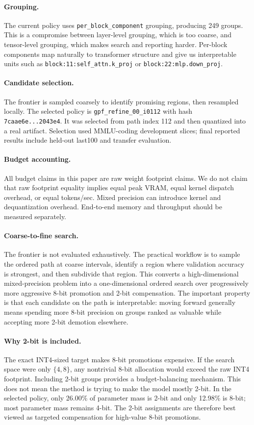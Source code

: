 \documentclass{article}
\newcommand{\policyid}{\texttt{gpf\_refine\_00\_i0112}}
\newcommand{\hashshort}{\texttt{7caae6e...2043e4}}
\begin{document}
\paragraph{Grouping.}
The current policy uses \texttt{per\_block\_component} grouping, producing 249 groups. This is a compromise between layer-level grouping, which is too coarse, and tensor-level grouping, which makes search and reporting harder. Per-block components map naturally to transformer structure and give us interpretable units such as \texttt{block:11:self\_attn.k\_proj} or \texttt{block:22:mlp.down\_proj}.

\paragraph{Candidate selection.}
The frontier is sampled coarsely to identify promising regions, then resampled locally. The selected policy is \policyid{} with hash \hashshort{}. It was selected from path index 112 and then quantized into a real artifact. Selection used MMLU-coding development slices; final reported results include held-out last100 and transfer evaluation.

\paragraph{Budget accounting.}
All budget claims in this paper are raw weight footprint claims. We do not claim that raw footprint equality implies equal peak VRAM, equal kernel dispatch overhead, or equal tokens/sec. Mixed precision can introduce kernel and dequantization overhead. End-to-end memory and throughput should be measured separately.

\paragraph{Coarse-to-fine search.}
The frontier is not evaluated exhaustively. The practical workflow is to sample the ordered path at coarse intervals, identify a region where validation accuracy is strongest, and then subdivide that region. This converts a high-dimensional mixed-precision problem into a one-dimensional ordered search over progressively more aggressive 8-bit promotion and 2-bit compensation. The important property is that each candidate on the path is interpretable: moving forward generally means spending more 8-bit precision on groups ranked as valuable while accepting more 2-bit demotion elsewhere.

\paragraph{Why 2-bit is included.}
The exact INT4-sized target makes 8-bit promotions expensive. If the search space were only $\{4,8\}$, any nontrivial 8-bit allocation would exceed the raw INT4 footprint. Including 2-bit groups provides a budget-balancing mechanism. This does not mean the method is trying to make the model mostly 2-bit. In the selected policy, only 26.00\% of parameter mass is 2-bit and only 12.98\% is 8-bit; most parameter mass remains 4-bit. The 2-bit assignments are therefore best viewed as targeted compensation for high-value 8-bit promotions.
\end{document}
